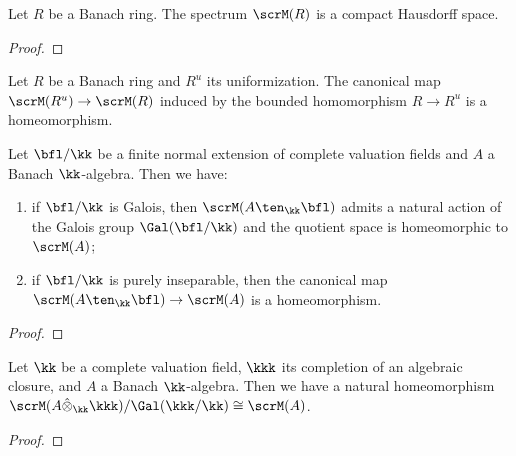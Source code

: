     \begin{theorem}\label{norm_spectrum_of_Banach_rings_is_compact_Hausdorff}
        Let \(R\) be a Banach ring.
        The spectrum \(\scrM(R)\) is a compact Hausdorff space.
    \end{theorem}
    \begin{proof}
    \end{proof}

    \begin{corollary}\label{cor:norm_spectrum_of_banach_rings_and_its_uniformization}
        Let \(R\) be a Banach ring and \(R^u\) its uniformization.
        The canonical map \(\scrM(R^u) \to \scrM(R)\) induced by the bounded homomorphism \(R \to R^u\) is a homeomorphism.
    \end{corollary}

    \begin{proposition}\label{prop:the_Galois_action_on_the_spectrum_of_banach_rings}
        Let \(\bfl/\kk\) be a finite normal extension of complete valuation fields and \(A\) a Banach \(\kk\)-algebra.
        Then we have:
        \begin{enumerate}
            \item if \(\bfl/\kk\) is Galois, then \(\scrM(A \ten_\kk \bfl)\) admits a natural action of the Galois group \(\Gal(\bfl/\kk)\) and the quotient space is homeomorphic to \(\scrM(A)\);
            \item if \(\bfl/\kk\) is purely inseparable, then the canonical map \(\scrM(A \ten_\kk \bfl) \to \scrM(A)\) is a homeomorphism.
        \end{enumerate}
    \end{proposition}
    \begin{proof}
    \end{proof}

    \begin{corollary}\label{cor:spectrum_of_banach_algebra_over_field_and_its_complete_algebraically_closed_field}
        Let \(\kk\) be a complete valuation field, \(\kkk\) its completion of an algebraic closure, and \(A\) a Banach \(\kk\)-algebra.
        Then we have a natural homeomorphism \(\scrM(A \hat{\otimes}_\kk \kkk)/\Gal(\kkk/\kk) \cong \scrM(A)\).
    \end{corollary}
    \begin{proof}
    \end{proof}

